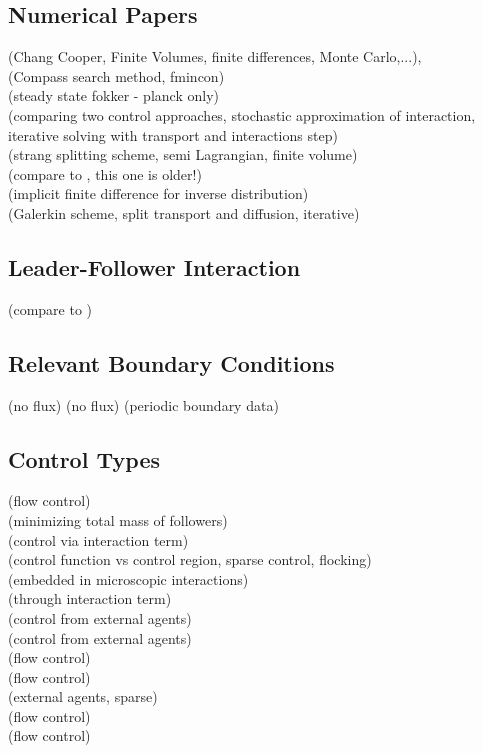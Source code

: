 \documentclass[11pt, a4paper]{article}
\theoremstyle{definition}
\begin{document}
\subsection*{Numerical Papers}
\cite{albi2016mean} (Chang Cooper, Finite Volumes, finite differences, Monte Carlo,...),\\
\cite{albi2016no2} (Compass search method, fmincon)\\
\cite{albi2014kinetic} (steady state fokker - planck only)\\
\cite{albi2016selective} (comparing two control approaches, stochastic approximation of interaction, iterative solving with transport and interactions step)\\
\cite{burger2019instantaneous} (strang splitting scheme, semi Lagrangian, finite volume)\\
\cite{burger2016controlling} (compare to \cite{burger2019instantaneous}, this one is older!)\\
\cite{carrillo2018no1}  (implicit finite difference for inverse distribution)\\
\cite{Pinnau_2017} (Galerkin scheme, split transport and diffusion, iterative)
\subsection*{Leader-Follower Interaction}
\cite{albi2016no2}
\cite{Albi_2014no1} (compare to \cite{albi2014kinetic} )
\cite{burger2019instantaneous}

\subsection*{Relevant Boundary Conditions}
\cite{albi2016mean} (no flux)
\cite{carrillo2018no1} (no flux)
\cite{carrillo2019mean} (periodic boundary data)


\subsection*{Control Types}
\cite{albi2016mean} (flow control)\\
\cite{albi2016no2} (minimizing total mass of followers)\\
\cite{albi2014kinetic} (control via interaction term)\\
\cite{albi2016selective} (control function vs control region, sparse control, flocking)\\
\cite{Albi_2014no1}(embedded in microscopic interactions)\\
\cite{burger2019meanfield}  (through interaction term)\\
\cite{burger2019instantaneous} (control from external agents)\\
\cite{burger2016controlling} (control from external agents)\\
\cite{carrillo2019mean} (flow control)\\
\cite{Fornasier_2014} (flow control)\\
\cite{Fornasier_2014no2} (external agents, sparse)\\
\cite{fornasier_lisini_orrieri_savare_2019} (flow control)\\
\cite{piccoli2014no1} (flow control)

\pagebreak	


\end{document}

